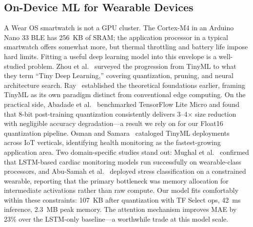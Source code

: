 \documentclass[HARVARD,Times2COL]{WileyNJDv5} %
\providecommand{\DIFadd}[1]{{\protect\color{red} #1}} %
\providecommand{\DIFdel}[1]{} %
\providecommand{\DIFaddbegin}{} %
\providecommand{\DIFaddend}{} %
\providecommand{\DIFdelbegin}{} %
\providecommand{\DIFdelend}{} %
\providecommand{\DIFscaledelfig}{0.5}
\newlength{\DIFdelgraphicswidth} %
\newlength{\DIFdelgraphicsheight} %
\providecommand{\DIFaddincludegraphics}[2][]{{\color{blue}\fbox{\DIFOincludegraphics[#1]{#2}}}} %
\providecommand{\DIFdelincludegraphics}[2][]{%
\sbox{\DIFdelgraphicsbox}{\DIFOincludegraphics[#1]{#2}}%
\settoboxwidth{\DIFdelgraphicswidth}{\DIFdelgraphicsbox} %
\settoboxtotalheight{\DIFdelgraphicsheight}{\DIFdelgraphicsbox} %
\scalebox{\DIFscaledelfig}{%
\parbox[b]{\DIFdelgraphicswidth}{\usebox{\DIFdelgraphicsbox}\\[-\baselineskip] \rule{\DIFdelgraphicswidth}{0em}}\llap{\resizebox{\DIFdelgraphicswidth}{\DIFdelgraphicsheight}{%
\setlength{\unitlength}{\DIFdelgraphicswidth}%
\begin{picture}(1,1)%
\thicklines\linethickness{2pt} %
{\color[rgb]{1,0,0}\put(0,0){\framebox(1,1){}}}%
{\color[rgb]{1,0,0}\put(0,0){\line( 1,1){1}}}%
{\color[rgb]{1,0,0}\put(0,1){\line(1,-1){1}}}%
\end{picture}%
}\hspace*{3pt}}} %
} %
\DeclareRobustCommand{\DIFaddbegin}{\DIFOaddbegin \let\includegraphics\DIFaddincludegraphics} %
\DeclareRobustCommand{\DIFaddend}{\DIFOaddend \let\includegraphics\DIFOincludegraphics} %
\DeclareRobustCommand{\DIFdelbegin}{\DIFOdelbegin \let\includegraphics\DIFdelincludegraphics} %
\DeclareRobustCommand{\DIFdelend}{\DIFOaddend \let\includegraphics\DIFOincludegraphics} %
\begin{document}
\subsection{On-Device ML for Wearable Devices}
A Wear OS smartwatch is not a GPU cluster. The Cortex-M4 in an Arduino Nano 33 BLE has 256~KB of SRAM; the application processor in a typical smartwatch offers somewhat more, but thermal throttling and battery life impose hard limits. Fitting a useful deep learning model into this envelope is a well-studied problem. Zhou et al.~\citep{zhou2025tinyml} surveyed the progression from TinyML to what they term ``Tiny Deep Learning,'' covering quantization, pruning, and neural architecture search. Ray~\citep{ray2022} established the theoretical foundations earlier, framing TinyML as its own paradigm distinct from conventional edge computing.
On the practical side, Abadade et al.~\citep{abadade2023} benchmarked TensorFlow Lite Micro and found that 8-bit post-training quantization consistently delivers 3--4$\times$ size reduction with negligible accuracy degradation---a result we rely on for our Float16 quantization pipeline. Osman and Samara~\citep{osman2024} cataloged TinyML deployments across IoT verticals, identifying health monitoring as the fastest-growing application area. Two domain-specific studies stand out: Mughal et al.~\citep{mughal2025} confirmed that LSTM-based cardiac monitoring models run successfully on wearable-class processors, and Abu-Samah et al.~\citep{abusamah2025} deployed stress classification on a constrained wearable, reporting that the primary bottleneck was memory allocation for intermediate activations rather than raw compute.
Our model fits comfortably within these constraints: \DIFdelbegin \DIFdel{22}\DIFdelend \DIFaddbegin \DIFadd{107}\DIFaddend ~KB after quantization \DIFaddbegin \DIFadd{with TF Select ops}\DIFaddend , 42~ms inference, 2.3~MB peak memory. The attention mechanism \DIFdelbegin \DIFdel{adds roughly 3~KB to the LSTM-only baseline but }\DIFdelend improves MAE by \DIFdelbegin \DIFdel{32\% ---a }\DIFdelend \DIFaddbegin \DIFadd{23\% over the LSTM-only baseline---a }\DIFaddend worthwhile trade at this model scale.
\end{document}
